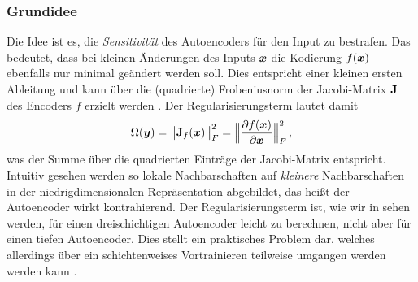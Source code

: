 \subsubsection{Grundidee}
\label{ch:MethodenDerDimRed:CAE:Grundidee}
Die Idee ist
es, die \textit{Sensitivität} des Autoencoders für den Input zu bestrafen. Das bedeutet, dass bei
kleinen Änderungen des Inputs $\bm{x}$ die Kodierung $f(\bm{x})$ ebenfalls nur minimal geändert
werden soll. Dies entspricht einer kleinen ersten Ableitung und kann über die (quadrierte)
Frobeniusnorm der Jacobi-Matrix $\mathbf{J}$ des Encoders $f$ erzielt werden \parencites[2]{Rifai.2011}[521]{Goodfellow.2016}. Der Regularisierungsterm lautet damit
\begin{equation}
	\label{eq:CAE-Regularisierung}
	\Omega(\vect{y}) = \norm[\big]{\mat{J}_f(\vect{x})}_F^2 =  \norm[\Big]{ \frac{\partial f(\vect{x})}{\partial \vect{x}} }^2_F \, ,
\end{equation}
was der Summe über die quadrierten Einträge der Jacobi-Matrix entspricht. Intuitiv gesehen werden so lokale Nachbarschaften auf \textit{kleinere} Nachbarschaften in der niedrigdimensionalen Repräsentation abgebildet, das heißt der Autoencoder wirkt kontrahierend.
Der Regularisierungsterm ist, wie wir in  sehen werden, für einen dreischichtigen Autoencoder leicht zu berechnen, nicht aber für einen tiefen Autoencoder. Dies stellt ein praktisches Problem dar, welches allerdings über ein schichtenweises Vortrainieren teilweise umgangen werden werden kann \parencite[vgl.][522]{Goodfellow.2016}.

